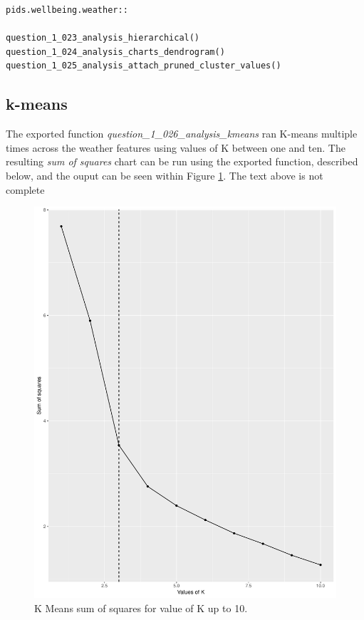 \documentclass[12pt, oneside, openany]{book}
\begin{document}
\bigskip
\begin{lstlisting}
pids.wellbeing.weather::

question_1_023_analysis_hierarchical()
question_1_024_analysis_charts_dendrogram()
question_1_025_analysis_attach_pruned_cluster_values()
\end{lstlisting}


\subsection*{k-means}
The exported function \emph{question\_1\_026\_analysis\_kmeans} ran K-means multiple times across the weather features using values of K between one and ten. The resulting \emph{sum of squares} chart can be run using the exported function,  described below, and the ouput can be seen within Figure \ref{fig:question_1_027_analysis_charts_sum_squares}.
\color{red}The text above is not complete\color{black}

\begin{figure}
	\centering
	\captionsetup{justification=centering}
	\includegraphics[scale=0.7]{question_1_027_analysis_charts_sum_squares}
	\caption{K Means sum of squares for value of K up to 10.}
	\label{fig:question_1_027_analysis_charts_sum_squares}
\end{figure}
\end{document}
